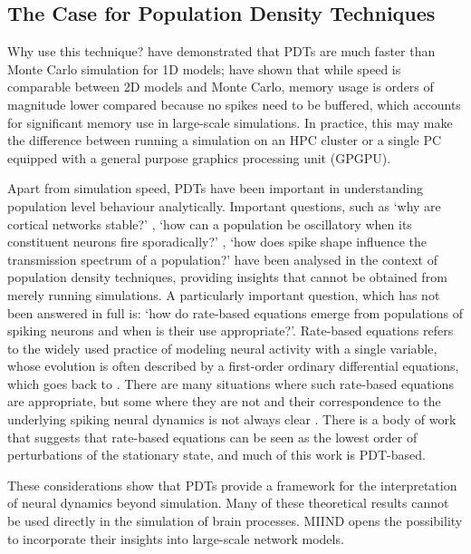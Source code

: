 \documentclass[utf8]{frontiersSCNS} %
\begin{document}
\subsection{The Case for Population Density Techniques} 
Why use this technique?
\cite{omurtag2000,nykamp2000population,kamps2003simple,iyer2013influence} have demonstrated that PDTs are much faster than Monte Carlo simulation for 1D models; \cite{de2019computational} have shown that while speed is comparable between 2D models and Monte Carlo, memory usage is orders of magnitude lower compared
because no spikes need to be buffered, which accounts for 
significant memory use in large-scale simulations. In practice, this may make the difference between running a simulation on an HPC cluster or a single PC equipped with a general purpose graphics processing unit (GPGPU).

Apart from simulation speed, PDTs have been important in understanding population level behaviour analytically. Important questions, such as `why are cortical networks
stable?' \citep{amit1997model}, `how can a population be oscillatory when its constituent neurons fire sporadically?'
\citep{brunel1999fast}, `how does spike shape influence the transmission spectrum of a population?'\citep{fourcaud2003spike} have been analysed in the context of population density techniques, providing insights that cannot be obtained from merely running simulations. A particularly important question, which has not been answered in full is: `how do rate-based equations emerge from populations of spiking neurons and when is their use appropriate?'. Rate-based equations refers to the widely used practice of modeling neural activity with a single variable, whose evolution is often described by a first-order ordinary differential equations, which goes back to \cite{wilson1972excitatory}. There are many situations where such rate-based equations are appropriate, but some where they are not and their correspondence to the underlying spiking neural dynamics is not always clear \citep{montbrio2015macroscopic,de2013generic}. There is a body of work that suggests that rate-based equations can be seen as the lowest order of perturbations of the stationary state, and much of this work is PDT-based.

These considerations show that PDTs provide a framework for the interpretation of neural dynamics beyond simulation. Many of these theoretical results cannot be used directly in the simulation of brain processes. MIIND opens the possibility to incorporate their insights into large-scale network models.\\
\\
\end{document}
